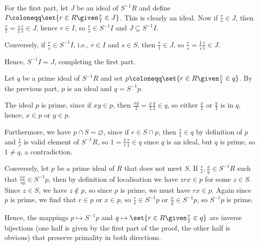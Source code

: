For the first part, let $J$ be an ideal of $S^{-1}R$ and define
$I\coloneqq \set{r \in R\given \frac{r}{1} \in J}$. This is clearly an ideal.
Now if $\frac{r}{s} \in J$, then $\frac{r}{1} = \frac{s}{1}\frac{r}{s} \in J$,
hence $r \in I$, so $\frac{r}{s} \in S^{-1}I$ and $J \subseteq S^{-1}I$.

Conversely, if $\frac{r}{s} \in S^{-1}I$, i.e., $r \in I$ and $s \in S$, then
$\frac{r}{1} \in J$, so $\frac{r}{s} = \frac{1}{s}\frac{r}{1} \in J$.

Hence, $S^{-1}I = J$, completing the first part.

Let $q$ be a prime ideal of $S^{-1}R$ and set $p\coloneqq\set{r \in R\given \frac{r}{1} \in q}$.
By the previous part, $p$ is an ideal and $q = S^{-1}p$.

The ideal $p$ is prime, since if $xy \in p$, then $\frac{xy}{1} = \frac{x}{1}\frac{y}{1} \in q$, so either
$\frac{x}{1}$ or $\frac{y}{1}$ is in $q$, hence, $x \in p$ or $y \in p$.

Furthermore, we have $p \cap S = \varnothing$, since if $r \in S\cap p$, then
$\frac{r}{1} \in q$ by definition of $p$ and $\frac{1}{r}$ is valid element of
$S^{-1}R$, so $1 = \frac{1}{r}\frac{r}{1} \in q$ since $q$ is an ideal, but
$q$ is prime, so $1 \neq q$, a contradiction.

Conversely, let $p$ be a prime ideal of $R$ that does not meet $S$. If
$\frac{r}{s}, \frac{x}{y} \in S^{-1}R$ such that $\frac{rx}{sy} \in S^{-1}p$,
then by definition of localisation we have $zrx \in p$ for some $z \in S$.
Since $z \in S$, we have $z\notin p$, so since $p$ is prime, we must have
$rx \in p$. Again since $p$ is prime, we find that $r \in p$ or $x \in p$, so
$\frac{r}{s} \in S^{-1}p$ or $\frac{x}{y} \in S^{-1}p$, so $S^{-1}p$ is prime.

Hence, the mappings $p \mapsto S^{-1}p$ and $q\mapsto\set{r \in R\given \frac{r}{1} \in q}$
are inverse bijections (one half is given by the first part of the proof,
the other half is obvious) that preserve primality in both directions.
